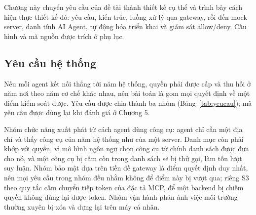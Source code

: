 
Chương này chuyển yêu cầu của đề tài thành thiết kế cụ thể và trình bày cách hiện thực thiết kế đó: yêu cầu, kiến trúc, luồng xử lý qua gateway, rồi đến mock server, danh tính AI Agent, tự động hóa triển khai và giám sát allow/deny. Cấu hình và mã nguồn được trích ở phụ lục.

\subsection{Yêu cầu hệ thống}

Nếu mỗi agent kết nối thẳng tới năm hệ thống, quyền phải được cấp và thu hồi ở năm nơi theo năm cơ chế khác nhau, nên bài toán là gom mọi quyết định về một điểm kiểm soát được. Yêu cầu được chia thành ba nhóm (Bảng~\ref{tab:yeucau}); mã yêu cầu được dùng lại khi đánh giá ở Chương 5.

Nhóm chức năng xuất phát từ cách agent dùng công cụ: agent chỉ cần một địa chỉ và thấy công cụ của năm hệ thống như của một server. Danh mục còn phải khớp với quyền, vì mô hình ngôn ngữ chọn công cụ từ chính danh sách được đưa cho nó, và một công cụ bị cấm còn trong danh sách sẽ bị thử gọi, làm tốn lượt suy luận. Nhóm bảo mật dựa trên tiền đề gateway là điểm quyết định duy nhất, nên mọi yêu cầu trong nhóm đều nhằm không để điểm này bị vượt qua; riêng S3 theo quy tắc cấm chuyển tiếp token của đặc tả MCP, để một backend bị chiếm quyền không dùng lại được token. Nhóm vận hành phản ánh việc môi trường thường xuyên bị xóa và dựng lại trên máy cá nhân.

